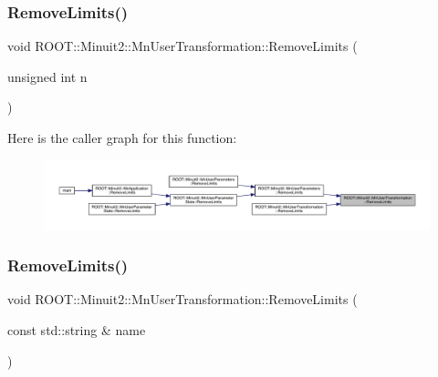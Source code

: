 \mbox{\label{classROOT_1_1Minuit2_1_1MnUserTransformation_aa7b791dee11011a7442e44c85c06d650}} 
\subsubsection{\texorpdfstring{RemoveLimits()}{RemoveLimits()}\hspace{0.1cm}{\footnotesize\ttfamily [2/4]}}
{\footnotesize\ttfamily void R\+O\+O\+T\+::\+Minuit2\+::\+Mn\+User\+Transformation\+::\+Remove\+Limits (\begin{DoxyParamCaption}\item[{unsigned int}]{n }\end{DoxyParamCaption})}

Here is the caller graph for this function\+:\nopagebreak
\begin{figure}[H]
\begin{center}
\leavevmode
\includegraphics[width=350pt]{d9/d98/classROOT_1_1Minuit2_1_1MnUserTransformation_aa7b791dee11011a7442e44c85c06d650_icgraph}
\end{center}
\end{figure}
\mbox{\label{classROOT_1_1Minuit2_1_1MnUserTransformation_ae5e9a3037483cfc354b739ef44cd1867}} 
\subsubsection{\texorpdfstring{RemoveLimits()}{RemoveLimits()}\hspace{0.1cm}{\footnotesize\ttfamily [3/4]}}
{\footnotesize\ttfamily void R\+O\+O\+T\+::\+Minuit2\+::\+Mn\+User\+Transformation\+::\+Remove\+Limits (\begin{DoxyParamCaption}\item[{const std\+::string \&}]{name }\end{DoxyParamCaption})}

